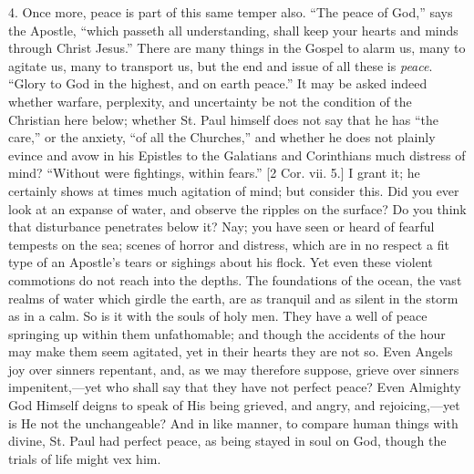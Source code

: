 4. Once more, peace is part of this same temper also. ``The
peace of God,'' says the Apostle, ``which passeth all
understanding, shall keep your hearts and minds through Christ
Jesus.'' There are many things in the Gospel to alarm us, many to
agitate us, many to transport us, but the end and issue of all these
is \emph{peace}. ``Glory to God in the highest, and on earth
peace.'' It may be asked indeed whether warfare, perplexity, and
uncertainty be not the condition of the Christian here below; whether
St. Paul himself does not say that he has ``the care,'' or the
anxiety, ``of all the Churches,'' and whether he does not
plainly evince and avow in his Epistles to the Galatians and
Corinthians much distress of mind? ``Without were fightings,
within fears.'' [2 Cor. vii. 5.] I grant it; he certainly shows at
times much agitation of mind; but consider this. Did you ever look at
an expanse of water, and observe the ripples on the surface? Do you
think that disturbance penetrates below it? Nay; you have seen or
heard of fearful tempests on the sea; scenes of horror and distress,
which are in no respect a fit type of an Apostle's tears or sighings
about his flock. Yet even these violent commotions do not reach into
the depths. The foundations of the ocean, the vast realms of water
which girdle the earth, are as tranquil and as silent in the storm as
in a calm. So is it with the souls of holy men. They have a well of
peace springing up within them unfathomable; and though the accidents
of the hour may make them seem agitated, yet in their hearts they are
not so. Even Angels joy over sinners repentant, and, as we may
therefore suppose, grieve over sinners impenitent,—yet who shall say
that they have not perfect peace? Even Almighty God Himself deigns to
speak of His being grieved, and angry, and rejoicing,—yet is He not
the unchangeable? And in like manner, to compare human things with
divine, St. Paul had perfect peace, as being stayed in soul on God,
though the trials of life might vex him.

